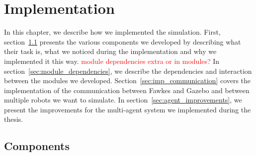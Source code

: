 \chapter{Implementation}
\label{cha:implementation}
In this chapter, we describe how we implemented the simulation. First, section~\ref{sec:components} presents the various components we developed by describing what their task is, what we noticed during the implementation and why we implemented it this way. \textcolor{red}{module dependencies extra or in modules?} In section~\ref{sec:module_dependencies}, we describe the dependencies and interaction between the modules we developed. Section~\ref{sec:imp_communication} covers the implementation of the communication between Fawkes and Gazebo and between multiple robots we want to simulate. In section~\ref{sec:agent_improvements}, we present the improvements for the multi-agent system we implemented during the thesis.

\section{Components}
\label{sec:components}
